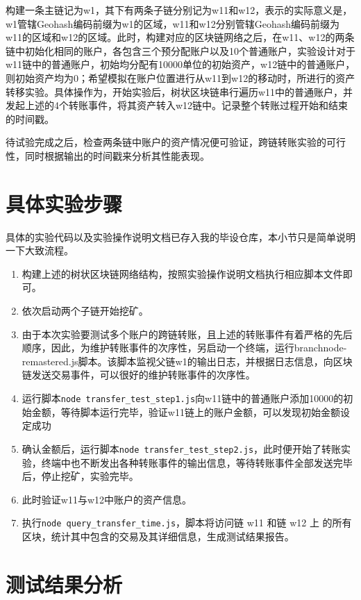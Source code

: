 构建一条主链记为w1，其下有两条子链分别记为w11和w12，表示的实际意义是，w1管辖Geohash编码前缀为w1的区域，w11和w12分别管辖Geohash编码前缀为w11的区域和w12的区域。此时，构建对应的区块链网络之后，在w11、w12的两条链中初始化相同的账户，各包含三个预分配账户以及10个普通账户，实验设计对于w11链中的普通账户，初始均分配有10000单位的初始资产，w12链中的普通账户，则初始资产均为0；希望模拟在账户位置进行从w11到w12的移动时，所进行的资产转移实验。具体操作为，开始实验后，树状区块链串行遍历w11中的普通账户，并发起上述的4个转账事件，将其资产转入w12链中。记录整个转账过程开始和结束的时间戳。

待试验完成之后，检查两条链中账户的资产情况便可验证，跨链转账实验的可行性，同时根据输出的时间戳来分析其性能表现。

\section{具体实验步骤}

具体的实验代码以及实验操作说明文档已存入我的毕设仓库，本小节只是简单说明一下大致流程。

\begin{enumerate}
    \item 构建上述的树状区块链网络结构，按照实验操作说明文档执行相应脚本文件即可。
    \item 依次启动两个子链开始挖矿。
    \item 由于本次实验要测试多个账户的跨链转账，且上述的转账事件有着严格的先后顺序，因此，为维护转账事件的次序性，另启动一个终端，运行branchnode-remastered.js脚本。该脚本监视父链w1的输出日志，并根据日志信息，向区块链发送交易事件，可以很好的维护转账事件的次序性。
    \item 运行脚本\verb|node transfer_test_step1.js|向w11链中的普通账户添加10000的初始金额，等待脚本运行完毕，验证w11链上的账户金额，可以发现初始金额设定成功
    \item 确认金额后，运行脚本\verb|node transfer_test_step2.js|，此时便开始了转账实验，终端中也不断发出各种转账事件的输出信息，等待转账事件全部发送完毕后，停止挖矿，实验完毕。
    \item 此时验证w11与w12中账户的资产信息。
    \item 执行\verb|node query_transfer_time.js|，脚本将访问链 w11 和链 w12 上
    的所有区块，统计其中包含的交易及其详细信息，生成测试结果报告。
\end{enumerate}

\section{测试结果分析 }

